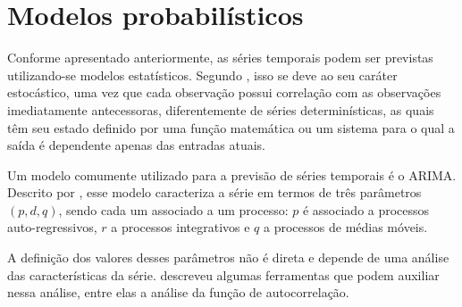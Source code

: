 \documentclass[
    12pt,
    oneside,
    a4paper,
    english,
    brazil
]{abntex2}
\begin{document}


\section{Modelos probabilísticos}


Conforme apresentado anteriormente, as séries temporais podem ser previstas utilizando-se modelos estatísticos. Segundo , isso se deve ao seu caráter estocástico, uma vez que cada observação possui correlação com as observações imediatamente antecessoras, diferentemente de séries determinísticas, as quais têm seu estado definido por uma função matemática ou um sistema para o qual a saída é dependente apenas das entradas atuais.

Um modelo comumente utilizado para a previsão de séries temporais é o ARIMA. Descrito por
, esse modelo caracteriza a série em termos de três parâmetros $(p,d,q)$, sendo cada
um associado a um processo: $p$ é associado a processos auto-regressivos,
$r$ a processos integrativos e $q$ a processos de médias móveis.

A definição dos valores desses parâmetros não é direta e depende de uma análise das características da série. 
 descreveu algumas ferramentas que podem auxiliar nessa análise, entre elas a análise da função de autocorrelação.
\end{document}
